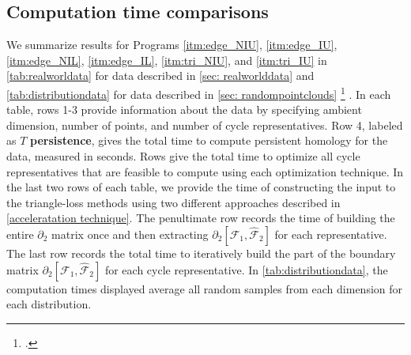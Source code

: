 \subsection{Computation time comparisons} 
\label{sec:timecomparisons}

We summarize results for Programs \ref{itm:edge_NIU}, \ref{itm:edge_IU}, \ref{itm:edge_NIL},
\ref{itm:edge_IL},
\ref{itm:tri_NIU}, and 
\ref{itm:tri_IU} in \tab \ref{tab:realworldata} for data described in \se \ref{sec: realworlddata} and \DIFaddbegin {} \DIFaddend \tab \ref{tab:distributiondata} for data described in \se \ref{sec: randompointclouds} \footnote{\DIFdelbegin {}\DIFdelend \DIFaddbegin {}\DIFaddend .} \DIFaddbegin {}\DIFaddend . In each table, rows 1-3 provide information about the data by specifying ambient dimension, number of points, and number of cycle representatives. Row 4, labeled as $T$ \textbf{persistence}, gives the total time to compute persistent homology for the data, measured in seconds. Rows \DIFdelbegin {}\DIFdelend \DIFaddbegin {}\DIFaddend give the total time to optimize all cycle representatives that are feasible to compute using each optimization technique. In the last two rows of each table, we provide the time of constructing the input to the triangle-loss methods using two different approaches described in \se \ref{acceleratation technique}. The penultimate row records the time of building the entire $\partial_{2}$ matrix once and then extracting $\partial_2[\mathcal{F}_1, \hat {\mathcal{F}}_{2}]$ for each representative. The last row records the total time to iteratively build the part of the boundary matrix $\partial_{2}[ \mathcal{F}_1 , \hat {\mathcal{F}}_{2} ]$ for each cycle representative. In \tab \ref{tab:distributiondata}, the computation times displayed average all random samples from each dimension for each distribution. 

